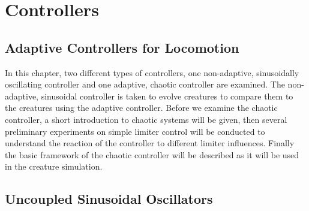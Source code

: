\documentclass[main]{subfiles}
\begin{document}
\setcounter{chapter}{2}

\chapter{Controllers} %

\label{Chapter\thechapter} %


\section{Adaptive Controllers for Locomotion}

In this chapter, two different types of controllers, one non-adaptive, sinusoidally oscillating controller and one adaptive, chaotic controller are examined. %
%
The non-adaptive, sinusoidal controller is taken to evolve creatures to compare them to the creatures using the adaptive controller. %
%
Before we examine the chaotic controller, a short introduction to chaotic systems will be given, then several preliminary experiments on simple limiter control will be conducted to understand the reaction of the controller to different limiter influences. %
%
Finally the basic framework of the chaotic controller will be described as it will be used in the creature simulation. %

\section{Uncoupled Sinusoidal Oscillators}
\label{sec:sinusoidal-oscillators}
\end{document}
